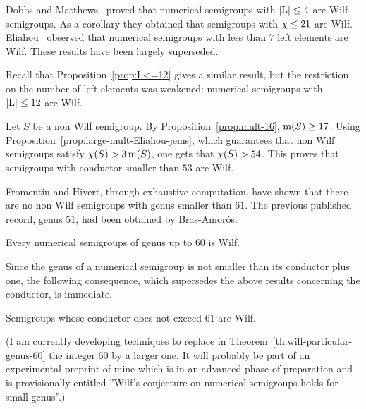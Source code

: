 Dobbs and Matthews~\cite[Th.~2.11]{DobbsMatthews2006} proved that numerical semigroups with $\left|\operatorname{L}\right|\le 4$ are Wilf semigroups. As a corollary they obtained that semigroups with $\operatorname{\chi}\le 21$ are Wilf. Eliahou~\cite[Prop.~7.4]{Eliahou2018JEMS-Wilfs} observed that numerical semigroups with less than $7$ left elements are Wilf.
These results have been largely superseded. 

Recall that Proposition~\ref{prop:L<=12} gives a similar result, but the restriction on the number of left elements was weakened: numerical semigroups with $\left|\operatorname{L}\right|\le 12$ are Wilf.
\medskip

Let $S$ be a non Wilf semigroup. By Proposition~\ref{prop:mult-16}, $\operatorname{m}(S)\ge 17$. Using Proposition~\ref{prop:large-mult-Eliahou-jems}, which guarantees that non Wilf semigroups satisfy $\operatorname{\chi}(S)>3\operatorname{m}(S)$, one gets that $\operatorname{\chi}(S)>54$. 
This proves that semigroups with conductor smaller than $53$ are Wilf. 
\medskip

Fromentin and Hivert, through exhaustive computation, have shown that there are no non Wilf semigroups with genus smaller than $61$. The previous published record, genus $51$, had been obtained by Bras-Amorós\cite{Bras-Amoros2008SF-Fibonacci}.

\begin{theorem}\label{th:wilf-particular-genus-60}
Every numerical semigroups of genus up to $60$ is Wilf.
\end{theorem}
Since the genus of a numerical semigroup is not smaller than its conductor plus one, the following consequence, which supersedes the above results concerning the conductor, is immediate.
\begin{corollary}
	Semigroups whose conductor does not exceed $61$ are Wilf.
\end{corollary}

(I am currently developing techniques to replace in Theorem~\ref{th:wilf-particular-genus-60} the integer $60$ by a larger one.
It will probably be part of an experimental preprint of mine which is in an advanced phase of preparation 
and is provisionally entitled ''Wilf's conjecture on numerical semigroups holds for small genus''.)
